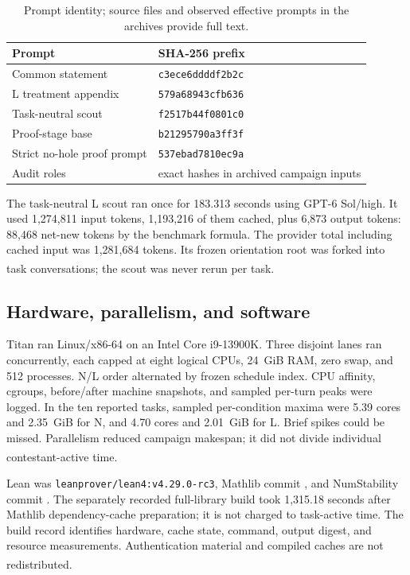 \documentclass[10pt,a4paper]{article}
\newcommand{\src}[1]{\textsuperscript{\cite{#1}}}
\begin{document}
\begin{table}[ht]\centering\small
\begin{tabular}{@{}ll@{}}\toprule
Prompt & SHA-256 prefix\\\midrule
Common statement & \texttt{c3ece6ddddf2b2c}\\
L treatment appendix & \texttt{579a68943cfb636}\\
Task-neutral scout & \texttt{f2517b44f0801c0}\\
Proof-stage base & \texttt{b21295790a3ff3f}\\
Strict no-hole proof prompt & \texttt{537ebad7810ec9a}\\
Audit roles & exact hashes in archived campaign inputs\\
\bottomrule\end{tabular}
\caption{Prompt identity; source files and observed effective prompts in the
archives provide full text.\cite{prompts,proofprompt,evidence}}
\end{table}

The task-neutral L scout ran once for 183.313 seconds using GPT-6 Sol/high.
It used 1,274,811 input tokens, 1,193,216 of them cached, plus 6,873 output
tokens: 88,468 net-new tokens by the benchmark formula. The provider total
including cached input was 1,281,684 tokens. Its frozen orientation root
was forked into task conversations; the scout was never rerun per task.
\src{warmroot,warmscout}

\subsection{Hardware, parallelism, and software}

Titan ran Linux/x86-64 on an Intel Core i9-13900K. Three disjoint lanes ran
concurrently, each capped at eight logical CPUs, 24~GiB RAM, zero swap, and
512 processes. N/L order alternated by frozen schedule index. CPU affinity,
cgroups, before/after machine snapshots, and sampled per-turn peaks were
logged. In the ten reported tasks, sampled per-condition maxima were 5.39
cores and 2.35~GiB for N, and 4.70 cores and 2.01~GiB for L. Brief spikes
could be missed. Parallelism reduced campaign makespan; it did not divide
individual contestant-active time.\src{summary,evidence}

Lean was \texttt{leanprover/lean4:v4.29.0-rc3}, Mathlib commit
\texttt{}, and
NumStability commit
\texttt{}.
The separately recorded full-library build took 1,315.18 seconds after
Mathlib dependency-cache preparation; it is not charged to task-active time.
The build record identifies hardware, cache state, command, output digest,
and resource measurements. Authentication material and compiled caches are
not redistributed.\src{buildrecord,librarysnapshot,runtimesnapshot}
\end{document}
